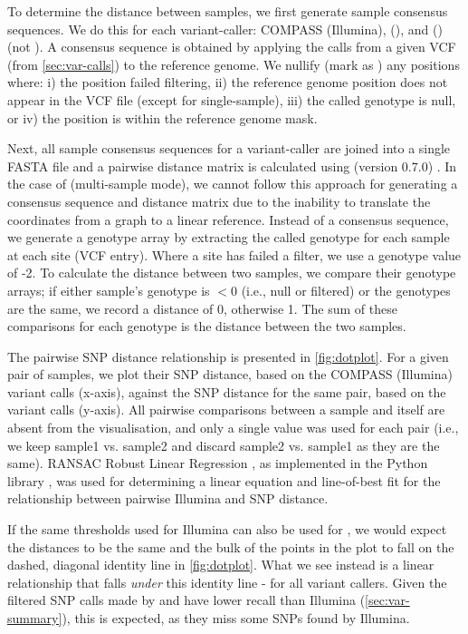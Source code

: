 To determine the distance between samples, we first generate sample consensus sequences. We do this for each variant-caller: COMPASS (Illumina), \bcftools{} (\ont{}), and \pandora{}  (\ont{}) (not \compare{}). A consensus sequence is obtained by applying the calls from a given VCF (from \autoref{sec:var-calls}) to the \mtb{} reference genome. We nullify (mark as ) any positions where: i) the position failed filtering, ii) the reference genome position does not appear in the VCF file (except for \pandora{} single-sample), iii) the called genotype is null, or iv) the position is within the reference genome mask. 

Next, all sample consensus sequences for a variant-caller are joined into a single FASTA file and a pairwise distance matrix is calculated using  (version 0.7.0) \cite{snp-dists}. In the case of \compare{} (multi-sample mode), we cannot follow this approach for generating a consensus sequence and distance matrix due to the inability to translate the coordinates from a graph to a linear reference. Instead of a consensus sequence, we generate a genotype array by extracting the called genotype for each sample at each site (VCF entry). Where a site has failed a filter, we use a genotype value of -2. To calculate the distance between two samples, we compare their genotype arrays; if either sample's genotype is $<0$ (i.e., null or filtered) or the genotypes are the same, we record a distance of 0, otherwise 1. The sum of these comparisons for each genotype is the distance between the two samples.

The pairwise SNP distance relationship is presented in \autoref{fig:dotplot}. For a given pair of samples, we plot their SNP distance, based on the COMPASS (Illumina) variant calls (x-axis), against the SNP distance for the same pair, based on the \ont{} variant calls (y-axis). All pairwise comparisons between a sample and itself are absent from the visualisation, and only a single value was used for each pair (i.e., we keep sample1 vs. sample2 and discard sample2 vs. sample1 as they are the same). RANSAC Robust Linear Regression \cite{fischler1981}, as implemented in the Python library  \cite{scikitlearn}, was used for determining a linear equation and line-of-best fit for the relationship between pairwise Illumina and \ont{} SNP distance.

If the same thresholds used for Illumina can also be used for \ont{}, we would expect the distances to be the same and the bulk of the points in the plot to fall on the dashed, diagonal identity line in \autoref{fig:dotplot}. What we see instead is a linear relationship that falls \emph{under} this identity line - for all \ont{} variant callers. Given the filtered \ont{} SNP calls made by \bcftools{} and \pandora{} have lower recall than Illumina (\autoref{sec:var-summary}), this is expected, as they miss some SNPs found by Illumina.


